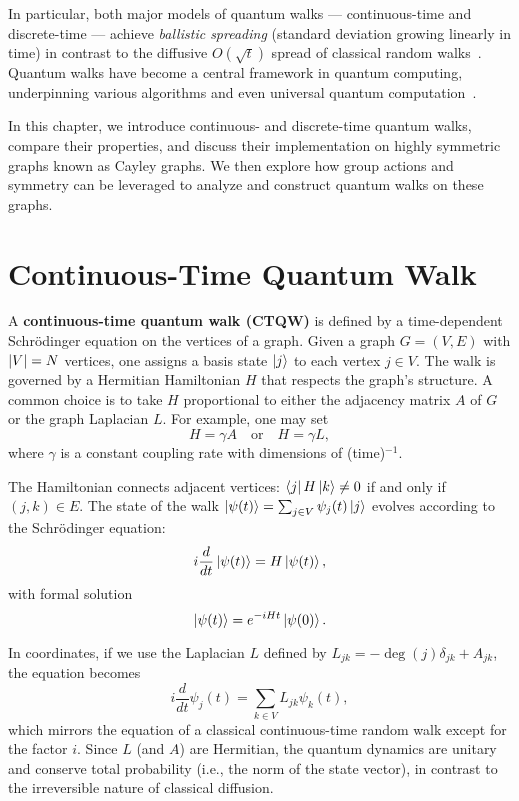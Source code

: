 \documentclass[12pt]{report}
\begin{document}
In particular, both major models of quantum walks --- continuous-time and discrete-time --- achieve \emph{ballistic spreading} (standard deviation growing linearly in time) in contrast to the diffusive $O(\sqrt{t})$ spread of classical random walks~\cite{childs2003quantum}. Quantum walks have become a central framework in quantum computing, underpinning various algorithms and even universal quantum computation~\cite{file_gwrqpr3gkui6gav6sze4dj}.

In this chapter, we introduce continuous- and discrete-time quantum walks, compare their properties, and discuss their implementation on highly symmetric graphs known as Cayley graphs. We then explore how group actions and symmetry can be leveraged to analyze and construct quantum walks on these graphs.



\section{Continuous-Time Quantum Walk}


A \textbf{continuous-time quantum walk (CTQW)} is defined by a time-dependent Schrödinger equation on the vertices of a graph. Given a graph $G=(V,E)$ with $\abs{V}=N$ vertices, one assigns a basis state $\ket{j}$ to each vertex $j \in V$. The walk is governed by a Hermitian Hamiltonian $H$ that respects the graph's structure. A common choice is to take $H$ proportional to either the adjacency matrix $A$ of $G$ or the graph Laplacian $L$. For example, one may set
\[
H = \gamma A \quad \text{or} \quad H = \gamma L,
\]
where $\gamma$ is a constant coupling rate with dimensions of (time)$^{-1}$.

The Hamiltonian connects adjacent vertices: $\bra{j}H\ket{k} \neq 0$ if and only if $(j,k) \in E$. The state of the walk $\ket{\psi(t)} = \sum_{j \in V} \psi_j(t) \ket{j}$ evolves according to the Schrödinger equation:
\[
i \frac{d}{dt} \ket{\psi(t)} = H \ket{\psi(t)},
\]
with formal solution
\[
\ket{\psi(t)} = e^{-iHt} \ket{\psi(0)}.
\]

In coordinates, if we use the Laplacian $L$ defined by $L_{jk} = -\deg(j)\delta_{jk} + A_{jk}$, the equation becomes
\[
i \frac{d}{dt} \psi_j(t) = \sum_{k \in V} L_{jk} \psi_k(t),
\]
which mirrors the equation of a classical continuous-time random walk except for the factor $i$. Since $L$ (and $A$) are Hermitian, the quantum dynamics are unitary and conserve total probability (i.e., the norm of the state vector), in contrast to the irreversible nature of classical diffusion.
\end{document}
